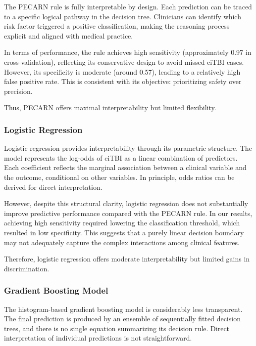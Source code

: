 \documentclass[11pt,letterpaper]{article}
\begin{document}
The PECARN rule is fully interpretable by design. Each prediction can be traced to a specific logical pathway in the decision tree. Clinicians can identify which risk factor triggered a positive classification, making the reasoning process explicit and aligned with medical practice.

In terms of performance, the rule achieves high sensitivity (approximately 0.97 in cross-validation), reflecting its conservative design to avoid missed ciTBI cases. However, its specificity is moderate (around 0.57), leading to a relatively high false positive rate. This is consistent with its objective: prioritizing safety over precision.

Thus, PECARN offers maximal interpretability but limited flexibility.

\subsubsection{Logistic Regression}

Logistic regression provides interpretability through its parametric structure. The model represents the log-odds of ciTBI as a linear combination of predictors. Each coefficient reflects the marginal association between a clinical variable and the outcome, conditional on other variables. In principle, odds ratios can be derived for direct interpretation.

However, despite this structural clarity, logistic regression does not substantially improve predictive performance compared with the PECARN rule. In our results, achieving high sensitivity required lowering the classification threshold, which resulted in low specificity. This suggests that a purely linear decision boundary may not adequately capture the complex interactions among clinical features.

Therefore, logistic regression offers moderate interpretability but limited gains in discrimination.

\subsubsection{Gradient Boosting Model}

The histogram-based gradient boosting model is considerably less transparent. The final prediction is produced by an ensemble of sequentially fitted decision trees, and there is no single equation summarizing its decision rule. Direct interpretation of individual predictions is not straightforward.
\end{document}
